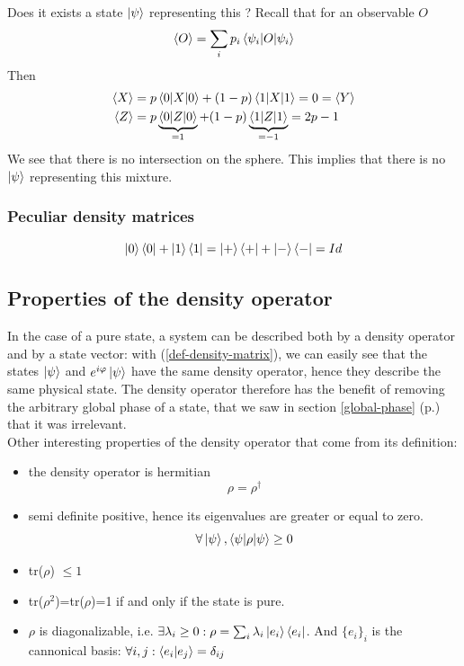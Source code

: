 \documentclass{article}
\begin{document}
Does it exists a state $\ket{\psi}$ representing this ? Recall that for an
observable $O$
\begin{equation}
    \braket{O}=\sum_ip_i\braket{\psi_i|O|\psi_i}
\end{equation}
Then
\begin{equation}
    \begin{aligned}
        \braket{X}&=p\braket{0|X|0}+(1-p)\braket{1|X|1}=0=\braket{Y}
        \\
        \braket{Z}&=p\underbrace{\braket{0|Z|0}}_{=1} + (1-p)\underbrace{\braket{1|Z|1}}_{=-1} = 2p-1
    \end{aligned}
\end{equation}
We see that there is no intersection on the sphere. This implies that there is
no $\ket{\psi}$ representing this mixture.

\subsubsection*{Peculiar density matrices}
\begin{equation}
    \ket{0}\bra{0} + \ket{1}\bra{1} = \ket{+}\bra{+} + \ket{-}\bra{-} = Id
\end{equation}

\subsection{Properties of the density operator}
\label{density-matrix-properties}
In the case of a pure state, a system can be described both by a density
operator and by a state vector: with (\ref{def-density-matrix}), we can easily
see that the states $\ket{\psi}$ and $e^{i\varphi}\ket{\psi}$ have the same
density operator, hence they describe the same physical state. The density
operator therefore has the benefit of removing the arbitrary global phase of a
state, that we saw in section \ref{global-phase} (p.\pageref{global-phase}) that
it was irrelevant.\\
Other interesting properties of the density operator that come from its
definition:
\begin{itemize}[label=-]
    \item the density operator is hermitian
    \begin{equation}
        \rho = \rho^\dagger
    \end{equation}
    \item semi definite positive, hence its eigenvalues are greater or equal to
    zero.
    \begin{equation}
        \forall \ket{\psi}, \braket{\psi|\rho|\psi} \geq 0
    \end{equation}
    \item tr($\rho$) $\leq 1$
    \item tr($\rho^2$)=tr($\rho$)=1 if and only if the state is pure.
    \item $\rho$ is diagonalizable, i.e. $\exists \lambda_i \geq 0 : \rho =
        \sum_i \lambda_i \ket{e_i}\bra{e_i}$. And $\{e_i\}_i$ is the cannonical
        basis: $\forall i,j: \braket{e_i|e_j}=\delta_{ij}$
\end{itemize}
\end{document}
